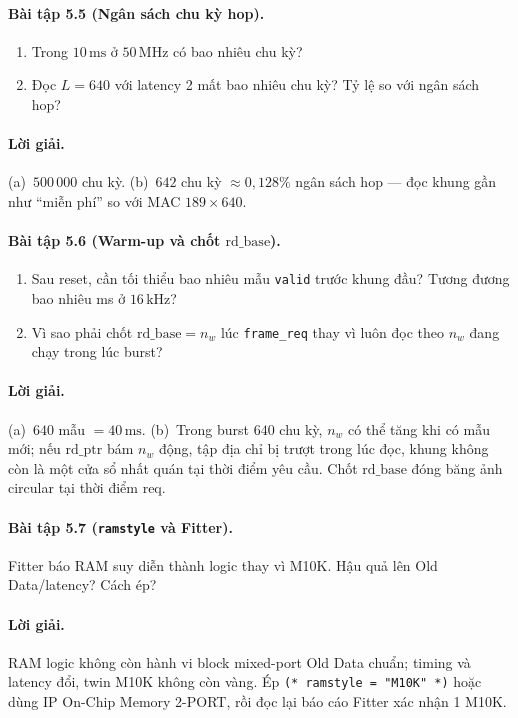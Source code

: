 \paragraph{Bài tập 5.5 (Ngân sách chu kỳ hop).}
\begin{enumerate}[label=\alph*)]
  \item Trong $10\,\text{ms}$ ở $50\,\text{MHz}$ có bao nhiêu chu kỳ?
  \item Đọc $L=640$ với latency 2 mất bao nhiêu chu kỳ? Tỷ lệ so với ngân sách hop?
\end{enumerate}
\paragraph{Lời giải.} (a)~$500\,000$ chu kỳ. (b)~$642$ chu kỳ $\approx 0{,}128\%$ ngân sách hop --- đọc khung gần như ``miễn phí'' so với MAC $189\times 640$.

\paragraph{Bài tập 5.6 (Warm-up và chốt $\mathrm{rd\_base}$).}
\begin{enumerate}[label=\alph*)]
  \item Sau reset, cần tối thiểu bao nhiêu mẫu \texttt{valid} trước khung đầu? Tương đương bao nhiêu ms ở $16\,\text{kHz}$?
  \item Vì sao phải chốt $\mathrm{rd\_base}=n_w$ lúc \texttt{frame\_req} thay vì luôn đọc theo $n_w$ đang chạy trong lúc burst?
\end{enumerate}
\paragraph{Lời giải.} (a)~$640$ mẫu $=40\,\text{ms}$. (b)~Trong burst $640$ chu kỳ, $n_w$ có thể tăng khi có mẫu mới; nếu $\mathrm{rd\_ptr}$ bám $n_w$ động, tập địa chỉ bị trượt trong lúc đọc, khung không còn là một cửa sổ nhất quán tại thời điểm yêu cầu. Chốt $\mathrm{rd\_base}$ đóng băng ảnh circular tại thời điểm req.

\paragraph{Bài tập 5.7 (\texttt{ramstyle} và Fitter).}
Fitter báo RAM suy diễn thành logic thay vì M10K. Hậu quả lên Old Data/latency? Cách ép?
\paragraph{Lời giải.} RAM logic không còn hành vi block mixed-port Old Data chuẩn; timing và latency đổi, twin M10K không còn vàng. Ép \texttt{(* ramstyle = "M10K" *)} hoặc dùng IP On-Chip Memory 2-PORT, rồi đọc lại báo cáo Fitter xác nhận 1 M10K.

